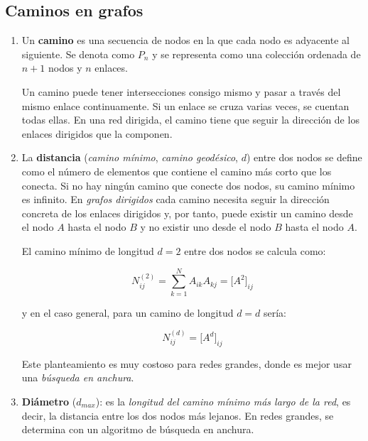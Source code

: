 \documentclass[10pt,spanish, landscape, twocolumn]{article}
\begin{document}
\subsection{\textcolor{temados}Caminos en grafos}
\begin{enumerate}[\color{temados}{$\triangleright$}]
    \item Un \textbf{\textcolor{temados}{camino}} es una secuencia de nodos en la que cada nodo es adyacente al siguiente. Se denota como $P_n$ y se representa como una colección ordenada de $n+1$ nodos y $n$ enlaces.

    Un camino puede tener intersecciones consigo mismo y pasar a través del mismo enlace continuamente. Si un enlace se cruza varias veces, se cuentan todas ellas. En una red dirigida, el camino tiene que seguir la dirección de los enlaces dirigidos que la componen.

    \item La \textbf{\textcolor{temados}{distancia}} (\textit{\textcolor{temados}{camino mínimo}}, \textit{\textcolor{temados}{camino geodésico}}, $d$) entre dos nodos se define como el número de elementos que contiene el camino más corto que los conecta. Si no hay ningún camino que conecte dos nodos, su camino mínimo es infinito. En \textit{\textcolor{temados}{grafos dirigidos}} cada camino necesita seguir la dirección concreta de los enlaces dirigidos y, por tanto, puede existir un camino desde el nodo $A$ hasta el nodo $B$ y no existir uno desde el nodo $B$ hasta el nodo $A$.

    El camino mínimo de longitud $d=2$ entre dos nodos se calcula como:

    \begin{displaymath}
        N_{ij}^{(2)} = \sum_{k=1}^N A_{ik}A_{kj} = \Big[A^2 \Big]_{ij}
    \end{displaymath}

    y en el caso general, para un camino de longitud $d=d$ sería: 

    \begin{displaymath}
        N_{ij}^{(d)} = \Big[A^d\Big]_{ij}
    \end{displaymath}

    Este planteamiento es muy costoso para redes grandes, donde es mejor usar una \textit{\textcolor{temados}{búsqueda en anchura}}.

    \item \textbf{\textcolor{temados}{Diámetro}} ($d_{max}$): es la \textit{\textcolor{temados}{longitud del camino mínimo más largo de la red}}, es decir, la distancia entre los dos nodos más lejanos. En redes grandes, se determina con un algoritmo de búsqueda en anchura.


\end{enumerate}
\end{document}

